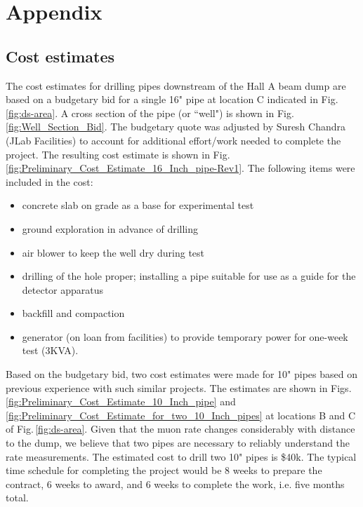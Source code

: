 \section{Appendix}
\label{sec:appx}
\subsection{Cost estimates}

The cost estimates for drilling pipes downstream of the Hall A beam dump are based on a budgetary bid for a single 16" pipe at location C indicated in 
Fig.\,\ref{fig:ds-area}. A cross section of the pipe (or ``well") is shown in Fig.\,\ref{fig:Well_Section_Bid}. 
The budgetary quote was adjusted by Suresh Chandra (JLab Facilities) to account for additional effort/work needed to complete the 
project. The resulting cost estimate is shown in Fig.\,\ref{fig:Preliminary_Cost_Estimate_16_Inch_pipe-Rev1}. The following
items were included in the cost:
\begin{itemize}
\item concrete slab on grade as a base for experimental test
\item ground exploration in advance of drilling
\item air blower to keep the well dry during test
\item drilling of the hole proper; installing a pipe suitable for use as a guide for the detector apparatus
\item backfill and compaction
\item generator (on loan from facilities) to provide temporary power for one-week test (3KVA).
\end{itemize}

Based on the budgetary bid, two cost estimates were made for 10" pipes based on previous experience with such similar projects. The estimates are shown in 
Figs.\ref{fig:Preliminary_Cost_Estimate_10_Inch_pipe} and \ref{fig:Preliminary_Cost_Estimate_for_two_10_Inch_pipes} at locations B and C of  Fig.\,\ref{fig:ds-area}.
Given that the muon rate changes considerably with
distance to the dump, we believe that two pipes are necessary to reliably understand the rate measurements. The estimated cost to drill two 10" pipes is \$40k. 
The typical time schedule for completing the project would be 8 weeks to prepare the contract, 6 weeks to award, and 6 weeks to complete the work, i.e. five months total. 

